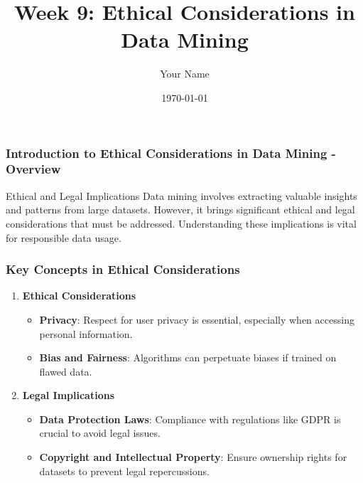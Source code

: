 \documentclass{beamer}
\title{Week 9: Ethical Considerations in Data Mining}
\author{Your Name}
\institute{Your Institution}
\date{\today}
\begin{document}
\frame{\titlepage}

\begin{frame}[fragile]
    \frametitle{Introduction to Ethical Considerations in Data Mining - Overview}
    \begin{block}{Ethical and Legal Implications}
        Data mining involves extracting valuable insights and patterns from large datasets. 
        However, it brings significant ethical and legal considerations that must be addressed. 
        Understanding these implications is vital for responsible data usage.
    \end{block}
\end{frame}

\begin{frame}[fragile]
    \frametitle{Key Concepts in Ethical Considerations}
    \begin{enumerate}
        \item \textbf{Ethical Considerations}
        \begin{itemize}
            \item \textbf{Privacy}: Respect for user privacy is essential, especially when accessing personal information.
            \item \textbf{Bias and Fairness}: Algorithms can perpetuate biases if trained on flawed data. 
        \end{itemize}
        \item \textbf{Legal Implications}
        \begin{itemize}
            \item \textbf{Data Protection Laws}: Compliance with regulations like GDPR is crucial to avoid legal issues.
            \item \textbf{Copyright and Intellectual Property}: Ensure ownership rights for datasets to prevent legal repercussions.
        \end{itemize}
    \end{enumerate}
\end{frame}
\end{document}
